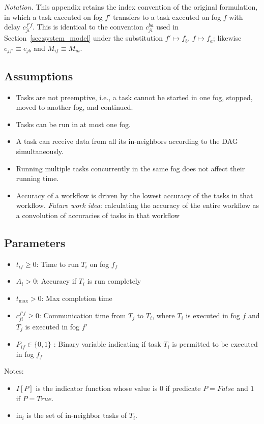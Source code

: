 \noindent\textit{Notation.} This appendix retains the index convention of the original
formulation, in which a task executed on fog $f'$ transfers to a task executed on fog $f$ with
delay $c_{ji}^{f'f}$. This is identical to the convention $c_{ji}^{ba}$ used in
Section~\ref{sec:system_model} under the substitution $f' \mapsto f_b$, $f \mapsto f_a$; likewise
$e_{jf'} \equiv e_{jb}$ and $M_{if} \equiv M_{ia}$.


\subsection{Assumptions}
\begin{itemize}[leftmargin=*]
    \item Tasks are not preemptive, i.e., a task cannot be started in one fog, stopped, moved to another fog, and continued.
    \item Tasks can be run in at most one fog.
    \item A task can receive data from all its in-neighbors  according to the DAG simultaneously.
    \item Running multiple tasks concurrently in the same fog does not affect their running time.
    \item Accuracy of a workflow is driven by the lowest accuracy of the tasks in that workflow. \textit{Future work idea}: calculating the accuracy of the entire workflow as a convolution of accuracies of tasks in that workflow 
\end{itemize}


\subsection{Parameters}
\begin{itemize}[leftmargin=*]
    \item $t_{if} \geq 0$: Time to run $T_i$ on fog $f_f$
    \item $A_i > 0$: Accuracy if $T_i$ is run completely
    \item $t_{\max} >0$: Max completion time
    \item $c_{ji}^{f'f} \geq 0$: Communication time from $T_j$ to $T_i$, where $T_i$ is executed in fog $f$ and $T_j$ is executed in fog $f'$
    \item $P_{if} \in \{0,1\}$ : Binary variable indicating if task $T_i$ is permitted to be executed in fog $f_f$ 
\end{itemize}
Notes: 
\begin{itemize}[leftmargin=*]
    \item $I[P]$ is the indicator function whose value is $0$ if predicate $P=False$ and $1$ if $P=True$.
    \item $\text{in}_i$ is the set of in-neighbor tasks of $T_i$.
\end{itemize}

